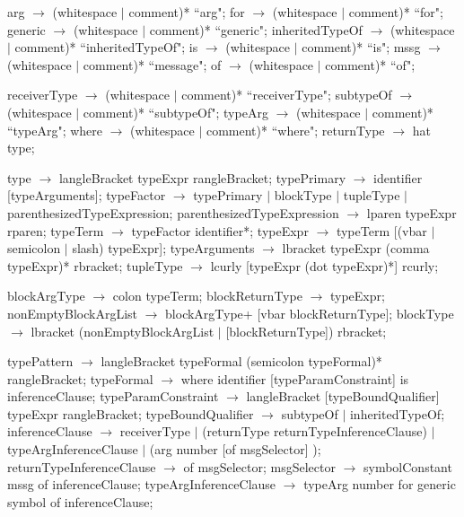 \documentclass{article}
\begin{document}
\begin{newspeak}
arg $\rightarrow$ (whitespace $|$ comment)* ``arg";
for $\rightarrow$ (whitespace $|$ comment)* ``for";
generic $\rightarrow$ (whitespace $|$ comment)* ``generic";
inheritedTypeOf $\rightarrow$ (whitespace $|$ comment)* ``inheritedTypeOf";
is $\rightarrow$ (whitespace $|$ comment)* ``is";
mssg $\rightarrow$ (whitespace $|$ comment)* ``message";
of $\rightarrow$ (whitespace $|$ comment)* ``of";

receiverType $\rightarrow$ (whitespace $|$ comment)* ``receiverType";
subtypeOf $\rightarrow$ (whitespace $|$ comment)* ``subtypeOf";
typeArg $\rightarrow$ (whitespace $|$ comment)* ``typeArg";
where $\rightarrow$ (whitespace $|$ comment)* ``where";
returnType $\rightarrow$ hat type;

type $\rightarrow$ langleBracket typeExpr rangleBracket;
typePrimary $\rightarrow$ identifier [typeArguments];
typeFactor $\rightarrow$ typePrimary $|$ blockType $|$ tupleType $|$ parenthesizedTypeExpression;
parenthesizedTypeExpression $\rightarrow$ lparen typeExpr rparen;
typeTerm $\rightarrow$ typeFactor identifier*;
typeExpr $\rightarrow$ typeTerm [(vbar $|$ semicolon $|$ slash) typeExpr];
typeArguments $\rightarrow$ lbracket typeExpr (comma typeExpr)* rbracket;
tupleType $\rightarrow$ lcurly [typeExpr (dot typeExpr)*] rcurly;

blockArgType $\rightarrow$ colon typeTerm;
blockReturnType $\rightarrow$ typeExpr;
nonEmptyBlockArgList $\rightarrow$ blockArgType+ [vbar blockReturnType];
blockType $\rightarrow$ lbracket (nonEmptyBlockArgList $|$ [blockReturnType]) rbracket;

typePattern $\rightarrow$ langleBracket typeFormal (semicolon typeFormal)* rangleBracket; 
typeFormal $\rightarrow$ where identifier [typeParamConstraint] is inferenceClause;
typeParamConstraint $\rightarrow$ langleBracket [typeBoundQualifier] typeExpr rangleBracket;
typeBoundQualifier $\rightarrow$ subtypeOf $|$ inheritedTypeOf;
inferenceClause $\rightarrow$ receiverType
		$|$ (returnType returnTypeInferenceClause)
		$|$ typeArgInferenceClause
		$|$ (arg number [of msgSelector] );
returnTypeInferenceClause $\rightarrow$ of msgSelector;
msgSelector $\rightarrow$ symbolConstant mssg of inferenceClause;
typeArgInferenceClause $\rightarrow$ typeArg number for generic symbol of inferenceClause;
                                                               
\end{newspeak}
\end{document}
